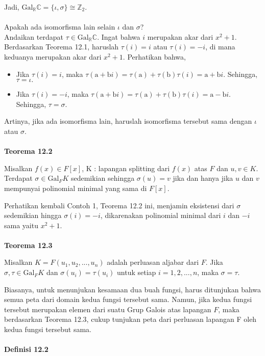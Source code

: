 	Jadi, $\mathrm{Gal}_{\mathbb{R}} \mathbb{C} = \{\iota,\sigma\} \cong \mathbb{Z}_2$.
\\ \\	Apakah ada isomorfisma lain selain $\iota$ dan $\sigma$?
\\	Andaikan terdapat $\tau\in \mathrm{Gal}_{\mathbb{R}} \mathbb{C}.$ Ingat bahwa $i$ merupakan akar dari $x^2+1.$ Berdasarkan Teorema 12.1, haruslah $\tau(i)=i$ atau $\tau(i)=-i$, di mana keduanya merupakan akar dari $x^2+1.$ Perhatikan bahwa,
	\begin{itemize}
	\item Jika $\tau(i)=i$, maka $\tau(\mathrm{a+b}i)=\tau(\mathrm{a})+\tau(\mathrm{b})\tau(i)=\mathrm{a+b}i.$ Sehingga, $\tau=\iota.$
	\item Jika $\tau(i)=-i$, maka $\tau(\mathrm{a+b}i)=\tau(\mathrm{a})+\tau(\mathrm{b})\tau(i)=\mathrm{a-b}i.$ Sehingga, $\tau=\sigma.$
	\end{itemize}
	Artinya, jika ada isomorfisma lain, haruslah isomorfisma tersebut sama dengan $\iota$ atau $\sigma$.
\\ \\
	\textbf{Teorema 12.2}
\par 	Misalkan $f(x)\in F[x]$, K : lapangan splitting dari $f(x)$ atas $F$ dan $u,v\in K$. Terdapat $\sigma \in \mathrm{Gal}_{F}K$ sedemikian sehingga $\sigma(u)=v$ jika dan hanya jika $u$ dan $v$ mempunyai polinomial minimal yang sama di $F[x]$.
\\
\par 	Perhatikan kembali Contoh 1, Teorema 12.2 ini, menjamin eksistensi dari $\sigma$ sedemikian hingga $\sigma(i)=-i$, dikarenakan polinomial minimal dari $i$ dan $-i$ sama yaitu $x^2+1.$
\\ \\
	\textbf{Teorema 12.3}
\par 	Misalkan $K=F(u_1,u_2,...,u_n)$ adalah perluasan aljabar dari $F$. Jika $\sigma,\tau \in \mathrm{Gal}_{F}K$ dan $\sigma(u_i)=\tau(u_i)$ untuk setiap $i=1,2,...,n$, maka $\sigma=\tau$.
\\ 
\par 	Biasanya, untuk menunjukan kesamaan dua buah fungsi, harus ditunjukan bahwa semua peta dari domain kedua fungsi tersebut sama. Namun, jika kedua fungsi tersebut merupakan elemen dari suatu Grup Galois atas lapangan $F$, maka berdasarkan Teorema 12.3, cukup 	tunjukan peta dari perluasan lapangan F oleh kedua fungsi tersebut sama.
\\ \\
	\textbf{Definisi 12.2}
